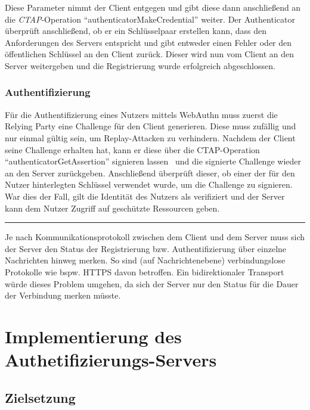 \documentclass[journal]{IEEEtran}
\begin{document}
Diese Parameter nimmt der Client entgegen und gibt diese dann anschließend an
die \textit{CTAP}-Operation ``authenticatorMakeCredential'' weiter. Der
Authenticator überprüft anschließend, ob er ein Schlüsselpaar erstellen kann,
dass den Anforderungen des Servers entspricht und gibt entweder einen Fehler
oder den öffentlichen Schlüssel an den Client zurück. Dieser wird nun vom
Client an den Server weitergeben und die Registrierung wurde erfolgreich
abgeschlossen.~\cite{ctapspec, webauthnspec}

\subsubsection{Authentifizierung}

Für die Authentifizierung eines Nutzers mittels WebAuthn muss zuerst die
Relying Party eine Challenge für den Client generieren. Diese muss zufällig und
nur einmal gültig sein, um Replay-Attacken zu verhindern. Nachdem der Client
seine Challenge erhalten hat, kann er diese über die CTAP-Operation
``authenticatorGetAssertion'' signieren lassen~\cite{ctapspec} und die
signierte Challenge wieder an den Server zurückgeben. Anschließend überprüft
dieser, ob einer der für den Nutzer hinterlegten Schlüssel verwendet wurde, um
die Challenge zu signieren.~\cite{webauthnspec} War dies der Fall, gilt die
Identität des Nutzers als verifiziert und der Server kann dem Nutzer Zugriff
auf geschützte Ressourcen geben.

\vspace{0.25em}
\rule{0.45\textwidth}{0.4pt}
\vspace{0.5em}

Je nach Kommunikationsprotokoll zwischen dem Client und dem Server muss sich
der Server den Status der Registrierung bzw. Authentifizierung über einzelne
Nachrichten hinweg merken. So sind (auf Nachrichtenebene) verbindungslose
Protokolle wie bspw. HTTPS davon betroffen. Ein bidirektionaler Transport
würde dieses Problem umgehen, da sich der Server nur den Status für die Dauer
der Verbindung merken müsste.

\section{Implementierung des Authetifizierungs-Servers}

\subsection{Zielsetzung}
\end{document}
